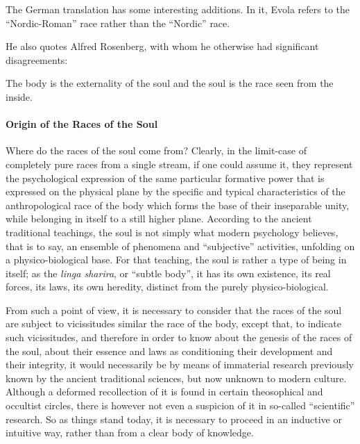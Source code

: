 The German translation has some interesting additions. In it, Evola refers to the ``Nordic-Roman'' race rather than the ``Nordic'' race.

He also quotes Alfred Rosenberg, with whom he otherwise had significant disagreements:

\begin{quotex}
The body is the externality of the soul and the soul is the race seen from the inside.
\end{quotex}

\paragraph{Origin of the Races of the Soul}


Where do the races of the soul come from? Clearly, in the limit-case of completely pure races from a single stream, if one could assume it, they represent the psychological expression of the same particular formative power that is expressed on the physical plane by the specific and typical characteristics of the anthropological race of the body which forms the base of their inseparable unity, while belonging in itself to a still higher plane. According to the ancient traditional teachings, the soul is not simply what modern psychology believes, that is to say, an ensemble of phenomena and ``subjective'' activities, unfolding on a physico-biological base. For that teaching, the soul is rather a type of being in itself; as the \emph{linga sharira}, or ``subtle body'', it has its own existence, its real forces, its laws, its own heredity, distinct from the purely physico-biological.

From such a point of view, it is necessary to consider that the races of the soul are subject to vicissitudes similar the race of the body, except that, to indicate such vicissitudes, and therefore in order to know about the genesis of the races of the soul, about their essence and laws as conditioning their development and their integrity, it would necessarily be by means of immaterial research previously known by the ancient traditional sciences, but now unknown to modern culture. Although a deformed recollection of it is found in certain theosophical and occultist circles, there is however not even a suspicion of it in so-called ``scientific'' research. So as things stand today, it is necessary to proceed in an inductive or intuitive way, rather than from a clear body of knowledge.

